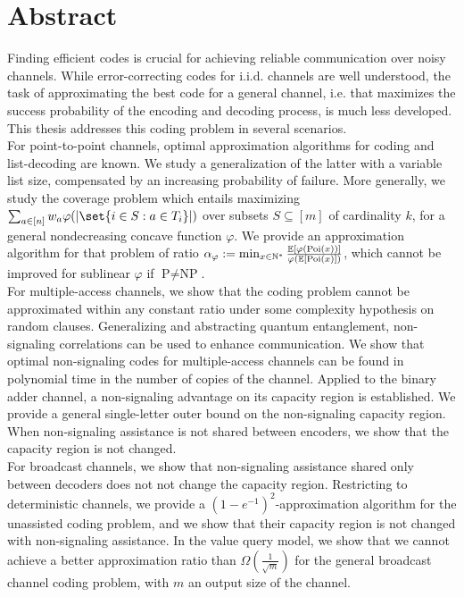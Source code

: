\chapter*{Abstract}
Finding efficient codes is crucial for achieving reliable communication over noisy channels. While error-correcting codes for i.i.d. channels are well understood, the task of approximating the best code for a general channel, i.e. that maximizes the success probability of the encoding and decoding process, is much less developed. This thesis addresses this coding problem in several scenarios.\vspace{2mm}\\
For point-to-point channels, optimal approximation algorithms for coding and list-decoding are known. We study a generalization of the latter with a variable list size, compensated by an increasing probability of failure. More generally, we study the coverage problem which entails maximizing $\sum_{a \in [n]} w_a \varphi(\abs{\set{i \in S : a \in T_i}})$ over subsets $S \subseteq [m]$ of cardinality $k$, for a general nondecreasing concave function $\varphi$. We provide an approximation algorithm for that problem of ratio $\alpha_{\varphi} := \min_{x \in \mathbb{N}^*} \frac{\mathbb{E}[\varphi(\operatorname{\text{Poi}}(x))]}{\varphi(\mathbb{E}[\operatorname{\text{Poi}}(x)])}$, which cannot be improved for sublinear $\varphi$ if $\textrm{P}\not=\textrm{NP}$.\vspace{2mm}\\
For multiple-access channels, we show that the coding problem cannot be approximated within any constant ratio under some complexity hypothesis on random clauses. Generalizing and abstracting quantum entanglement, non-signaling correlations can be used to enhance communication. We show that optimal non-signaling codes for multiple-access channels can be found in polynomial time in the number of copies of the channel. Applied to the binary adder channel, a non-signaling advantage on its capacity region is established. We provide a general single-letter outer bound on the non-signaling capacity region. When non-signaling assistance is not shared between encoders, we show that the capacity region is not changed.\vspace{2mm}\\
For broadcast channels, we show that non-signaling assistance shared only between decoders does not not change the capacity region. Restricting to deterministic channels, we provide a $(1-e^{-1})^2$-approximation algorithm for the unassisted coding problem, and we show that their capacity region is not changed with non-signaling assistance. In the value query model, we show that we cannot achieve a better approximation ratio than $\Omega\left(\frac{1}{\sqrt{m}}\right)$ for the general broadcast channel coding problem, with $m$ an output size of the channel.


